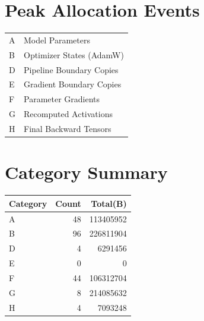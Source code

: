 \documentclass{article}
\begin{document}
\section*{Peak Allocation Events}
\small
\begin{tabular}{ll}
A & Model Parameters \\
B & Optimizer States (AdamW) \\
D & Pipeline Boundary Copies \\
E & Gradient Boundary Copies \\
F & Parameter Gradients \\
G & Recomputed Activations \\
H & Final Backward Tensors \\
\end{tabular}
\vspace{0.5em}
\section*{Category Summary}
\begin{tabular}{l r r}
Category & Count & Total(B) \\
\hline
A & 48 & 113405952 \\
B & 96 & 226811904 \\
D & 4 & 6291456 \\
E & 0 & 0 \\
F & 44 & 106312704 \\
G & 8 & 214085632 \\
H & 4 & 7093248 \\
\end{tabular}
\vspace{0.5em}
\end{document}
